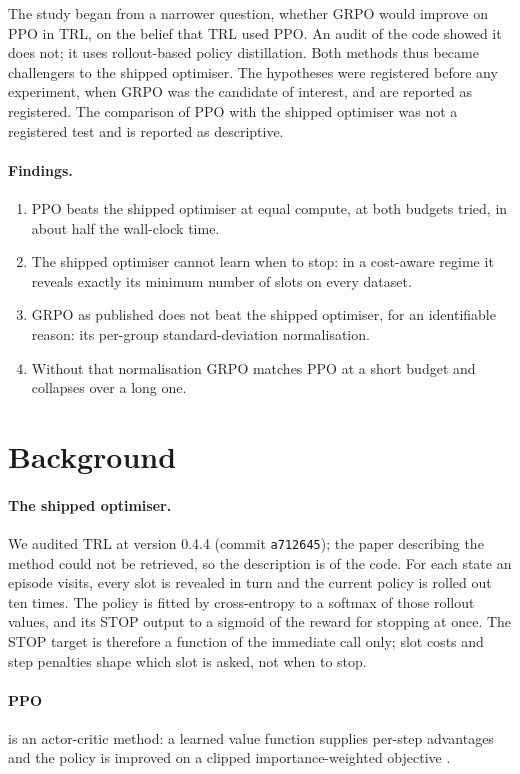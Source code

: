 \documentclass[11pt,a4paper]{article}
\begin{document}
The study began from a narrower question, whether GRPO would improve on PPO in TRL, on the belief that TRL used
PPO. An audit of the code showed it does not; it uses rollout-based policy distillation. Both methods thus became
challengers to the shipped optimiser. The hypotheses were registered before any experiment, when GRPO was the
candidate of interest, and are reported as registered. The comparison of PPO with the shipped optimiser was not a
registered test and is reported as descriptive.

\paragraph{Findings.}
\begin{enumerate}\setlength{\itemsep}{0pt}
\item PPO beats the shipped optimiser at equal compute, at both budgets tried, in about half the wall-clock time.
\item The shipped optimiser cannot learn when to stop: in a cost-aware regime it reveals exactly its minimum
      number of slots on every dataset.
\item GRPO as published does not beat the shipped optimiser, for an identifiable reason: its per-group
      standard-deviation normalisation.
\item Without that normalisation GRPO matches PPO at a short budget and collapses over a long one.
\end{enumerate}

\section{Background}

\paragraph{The shipped optimiser.} We audited TRL at version 0.4.4 (commit \texttt{a712645}); the paper
describing the method could not be retrieved, so the description is of the code. For each state an episode
visits, every slot is revealed in turn and the current policy is rolled out ten times. The policy is fitted by
cross-entropy to a softmax of those rollout values, and its STOP output to a sigmoid of the reward for stopping
at once. The STOP target is therefore a function of the immediate call only; slot costs and step penalties shape
which slot is asked, not when to stop.

\paragraph{PPO} is an actor-critic method: a learned value function supplies per-step advantages
\citep{schulman2015gae} and the policy is improved on a clipped importance-weighted objective
\citep{schulman2017ppo}.
\end{document}
